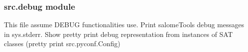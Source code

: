 \documentclass[a4paper,10pt,english]{sphinxmanual}
\begin{document}
\begin{fulllineitems}
\begin{fulllineitems}
\begin{quote}
\begin{description}
\end{description}\end{quote}

\end{fulllineitems}


\begin{fulllineitems}
\label{\detokenize{commands/apidoc/src:src.compilation.Builder.wmake}}
\end{fulllineitems}


\end{fulllineitems}



\subsubsection{src.debug module}
\label{\detokenize{commands/apidoc/src:module-src.debug}}\label{\detokenize{commands/apidoc/src:src-debug-module}}
This file assume DEBUG functionalities use.
Print salomeTools debug messages in sys.stderr.
Show pretty print debug representation from instances of SAT classes 
(pretty print src.pyconf.Config)
\end{document}
